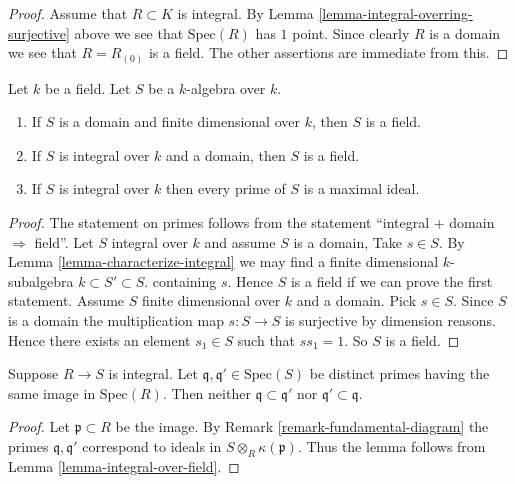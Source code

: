 \begin{proof}
Assume that $R \subset K$ is integral.
By Lemma \ref{lemma-integral-overring-surjective} above we see that
$\text{Spec}(R)$ has $1$ point. Since clearly $R$ is a domain we see
that $R = R_{(0)}$ is a field. The other assertions are immediate
from this.
\end{proof}

\begin{lemma}
\label{lemma-integral-over-field}
Let $k$ be a field. Let $S$ be a $k$-algebra over $k$.
\begin{enumerate}
\item If $S$ is a domain and finite dimensional over $k$,
then $S$ is a field.
\item If $S$ is integral over $k$ and a domain,
then $S$ is a field.
\item If $S$ is integral over $k$ then every prime of
$S$ is a maximal ideal.
\end{enumerate}
\end{lemma}

\begin{proof}
The statement on primes follows from the statement
``integral $+$ domain $\Rightarrow$ field''.
Let $S$ integral over $k$ and assume $S$ is a domain,
Take $s \in S$. By Lemma
\ref{lemma-characterize-integral} we may find a
finite dimensional $k$-subalgebra $k \subset S' \subset S$.
containing $s$. Hence $S$ is a field if we can prove the
first statement. Assume $S$ finite dimensional
over $k$ and a domain. Pick $s\in S$.
Since $S$ is a domain the multiplication
map $s : S \to S$ is surjective by dimension
reasons. Hence there exists an element $s_1 \in S$
such that $ss_1 = 1$. So $S$ is a field.
\end{proof}

\begin{lemma}
\label{lemma-integral-no-inclusion}
Suppose $R \to S$ is integral.
Let $\mathfrak q, \mathfrak q' \in \text{Spec}(S)$
be distinct primes
having the same image in $\text{Spec}(R)$.
Then neither $\mathfrak q \subset \mathfrak q'$
nor $\mathfrak q' \subset \mathfrak q$.
\end{lemma}

\begin{proof}
Let $\mathfrak p \subset R$ be the image.
By Remark \ref{remark-fundamental-diagram}
the primes $\mathfrak q, \mathfrak q'$
correspond to ideals in
$S \otimes_R \kappa(\mathfrak p)$.
Thus the lemma follows from Lemma \ref{lemma-integral-over-field}.
\end{proof}

